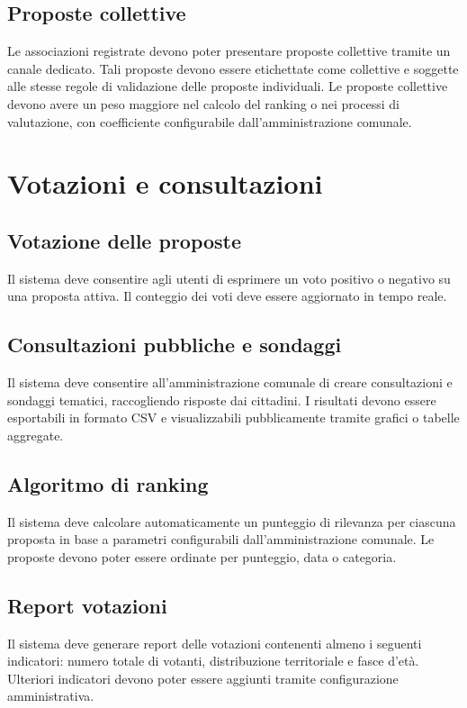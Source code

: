 \subsection{Proposte collettive}
Le associazioni registrate devono poter presentare proposte collettive tramite un canale dedicato.  
Tali proposte devono essere etichettate come collettive e soggette alle stesse regole di validazione delle proposte individuali.  
Le proposte collettive devono avere un peso maggiore nel calcolo del ranking o nei processi di valutazione, con coefficiente configurabile dall’amministrazione comunale.

\section{Votazioni e consultazioni}

\subsection{Votazione delle proposte}
Il sistema deve consentire agli utenti di esprimere un voto positivo o negativo su una proposta attiva.  
Il conteggio dei voti deve essere aggiornato in tempo reale.

\subsection{Consultazioni pubbliche e sondaggi}
Il sistema deve consentire all’amministrazione comunale di creare consultazioni e sondaggi tematici, raccogliendo risposte dai cittadini.  
I risultati devono essere esportabili in formato CSV e visualizzabili pubblicamente tramite grafici o tabelle aggregate.

\subsection{Algoritmo di ranking}
Il sistema deve calcolare automaticamente un punteggio di rilevanza per ciascuna proposta in base a parametri configurabili dall'amministrazione comunale.  
Le proposte devono poter essere ordinate per punteggio, data o categoria.

\subsection{Report votazioni}
Il sistema deve generare report delle votazioni contenenti almeno i seguenti indicatori: numero totale di votanti, distribuzione territoriale e fasce d’età.  
Ulteriori indicatori devono poter essere aggiunti tramite configurazione amministrativa.

